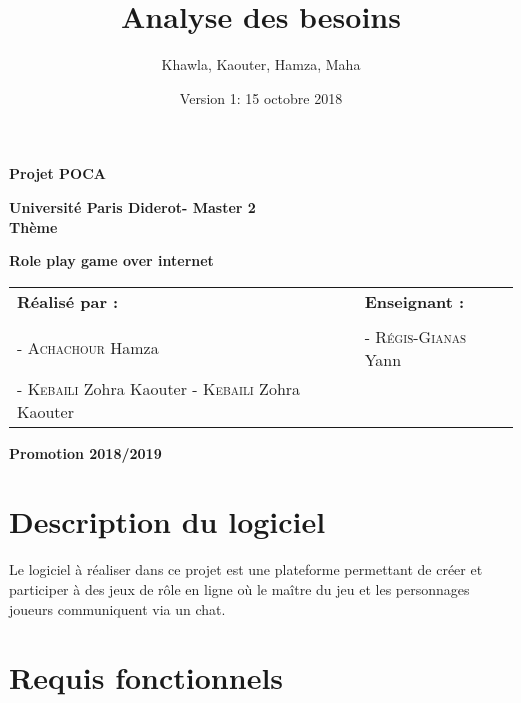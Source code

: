 \documentclass[12pt]{article}
\begin{document}
\begin{center}

 \vspace*{1cm}
  \LARGE
  \textbf{Projet POCA\\}
  \large
 
   \large
  	\vspace{2cm}
  \textbf{Université Paris Diderot- Master 2}\\
  \vspace{1cm}
  \LARGE
  \textbf{Thème}\\

  \LARGE
  \setlength{\fboxsep}{0.5cm}
  \begin{framed}
	\textbf{Role play game over internet}
  \end{framed}
  \vspace{2cm}
\begin{table}[H]
   \setlength{\tabcolsep}{2cm}
    \large
	\centering
	\begin{tabular}{ll}
		\textbf{Réalisé par :}    
		 & \textbf{Enseignant : } \\  \\
		 -\textsc{ Achachour} Hamza
	
	& -\textsc{ Régis-Gianas}  Yann   \\
		-\textsc{ Kebaili} Zohra Kaouter 
		-\textsc{ Kebaili} Zohra Kaouter 
  

	\end{tabular}
  \end{table}
  \vspace{\fill}
  \large
  \textbf{Promotion 2018/2019}
   \end{center}
\title{\Huge{Analyse des besoins}}
\author{Khawla, Kaouter, Hamza, Maha}
\date{Version 1: 15 octobre 2018}
\newpage




\maketitle
\section{Description du logiciel}
\par Le logiciel à réaliser dans ce projet est une plateforme permettant de créer et participer à des jeux de rôle en ligne où le maître du jeu et les personnages joueurs communiquent via un chat.

\section{Requis fonctionnels}
\end{document}
